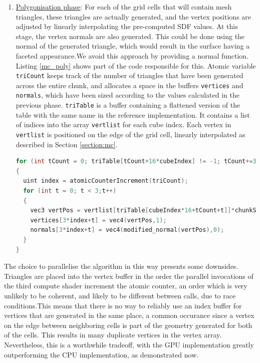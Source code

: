 \documentclass{article}
\begin{document}
\begin{enumerate}
\item \underline{Polygonisation phase}: For each of the grid cells that will contain mesh triangles, these triangles are actually generated, and the vertex positions are adjusted by linearly interpolating the pre-computed SDF values. At this stage, the vertex normals are also generated. This could be done using the normal of the generated triangle, which would result in the surface having a faceted appearance.We avoid this approach by providing a normal function. Listing \ref{mc_poly} shows part of the code responsible for this. Atomic variable \texttt{triCount} keeps track of the number of triangles that have been generated across the entire chunk, and allocates a space in the buffers \texttt{vertices} and \texttt{normals}, which have been sized according to the values calculated in the previous phase. \texttt{triTable} is a buffer containing a flattened version of the table with the same name in the reference implementation. It contains a list of indices into the array \texttt{vertlist} for each cube index. Each vertex in \texttt{vertlist} is positioned on the edge of the grid cell, linearly interpolated as described in Section \ref{section:mc}.
\begin{lstlisting}[language=C++,label={mc_poly},caption={GLSL code for generating the geometry of a grid cell.}]
for (int tCount = 0; triTable[tCount+16*cubeIndex] != -1; tCount+=3)
{
  uint index = atomicCounterIncrement(triCount);
  for (int t = 0; t < 3;t++)
  {
    vec3 vertPos = vertlist[triTable[cubeIndex*16+tCount+t]]*chunkStride + chunkPosition;
    vertices[3*index+t] = vec4(vertPos,1);
    normals[3*index+t] = vec4(modified_normal(vertPos),0);
  }
}
\end{lstlisting}

\end{enumerate}
The choice to parallelise the algorithm in this way presents some downsides. Triangles are placed into the vertex buffer in the order the parallel invocations of the third compute shader increment the atomic counter, an order which is very unlikely to be coherent, and likely to be different between calls, due to race conditions.This means that there is no way to reliably use an index buffer for vertices that are generated in the same place, a common occurance since a vertex on the edge between neighboring cells is part of the geometry generated for both of the cells. This results in many duplicate vertices in the vertex array. Nevertheless, this is a worthwhile tradeoff, with the GPU implementation greatly outperforming the CPU implementation, as demonstrated now.
\end{document}
